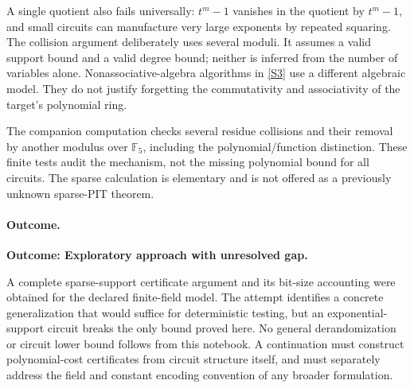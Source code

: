 \documentclass[11pt,a4paper]{article}
\numberwithin{equation}{section}
\newcommand{\F}{\mathbb{F}}
\newcommand{\sref}[2]{\hyperlink{source:#1:#2}{[S#2]}}
\begin{document}
A single quotient also fails universally: $t^m-1$ vanishes in the quotient
by $t^m-1$, and small circuits can manufacture very large exponents by
repeated squaring. The collision argument deliberately uses several
moduli. It assumes a valid support bound and a valid degree bound; neither
is inferred from the number of variables alone. Nonassociative-algebra
algorithms in \sref{30006708}{3} use a different algebraic model. They do not
justify forgetting the commutativity and associativity of the target's
polynomial ring.

The companion computation checks several residue collisions and their
removal by another modulus over $\F_5$, including the polynomial/function
distinction. These finite tests audit the mechanism, not the missing
polynomial bound for all circuits. The sparse calculation is elementary
and is not offered as a previously unknown sparse-PIT theorem.

\paragraph{Outcome.}
\textbf{Outcome: Exploratory approach with unresolved gap.}

A complete sparse-support certificate argument and its bit-size accounting
were obtained for the declared finite-field model. The attempt identifies
a concrete generalization that would suffice for deterministic testing,
but an exponential-support circuit breaks the only bound proved here.
No general derandomization or circuit lower bound follows from this notebook.
A continuation must construct polynomial-cost certificates from circuit
structure itself, and must separately address the field and constant
encoding convention of any broader formulation.

\needspace{170mm}
\end{document}
